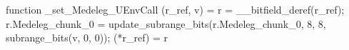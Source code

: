 function _set_Medeleg_UEnvCall (r_ref, v) = {
    r = __bitfield_deref(r_ref);
    r.Medeleg_chunk_0 = update_subrange_bits(r.Medeleg_chunk_0, 8, 8, subrange_bits(v, 0, 0));
    (*r_ref) = r
}
